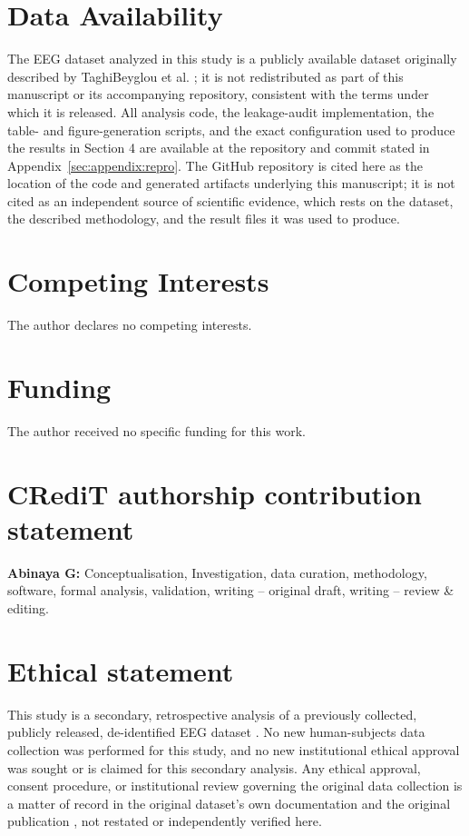 \documentclass[a4paper,fleqn]{cas-sc}
\begin{document}
\section*{Data Availability}
The EEG dataset analyzed in this study is a publicly available dataset originally described by TaghiBeyglou et al. \cite{taghibeyglou2022detection}; it is not redistributed as part of this manuscript or its accompanying repository, consistent with the terms under which it is released. All analysis code, the leakage-audit implementation, the table- and figure-generation scripts, and the exact configuration used to produce the results in Section 4 are available at the repository and commit stated in Appendix~\ref{sec:appendix:repro}. The GitHub repository is cited here as the location of the code and generated artifacts underlying this manuscript; it is not cited as an independent source of scientific evidence, which rests on the dataset, the described methodology, and the result files it was used to produce.



\section*{Competing Interests}
The author declares no competing interests.

\section*{Funding}
The author received no specific funding for this work.

\section*{CRediT authorship contribution statement}
\textbf{Abinaya G:} Conceptualisation, Investigation, data curation,
methodology, software, formal analysis, validation, writing -- original
draft, writing -- review \& editing.

\section*{Ethical statement}
This study is a secondary, retrospective analysis of a previously collected, publicly released, de-identified EEG dataset \cite{taghibeyglou2022detection}. No new human-subjects data collection was performed for this study, and no new institutional ethical approval was sought or is claimed for this secondary analysis. Any ethical approval, consent procedure, or institutional review governing the original data collection is a matter of record in the original dataset's own documentation and the original publication \cite{taghibeyglou2022detection}, not restated or independently verified here.
\end{document}
